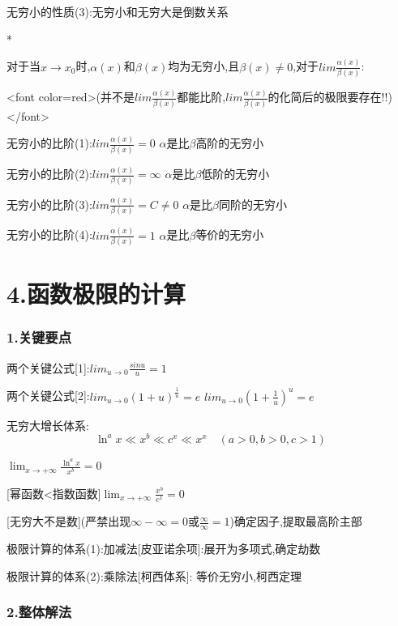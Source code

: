 \documentclass[11pt,a4paper,UTF8]{ctexart}
\begin{document}
无穷小的性质(3):无穷小和无穷大是倒数关系

\textit{}*

\textit{}对于当$x \to x_0$时,$\alpha(x)$和$\beta(x)$均为无穷小,且$\beta(x) \ne 0$,对于$lim\frac{\alpha(x)}{\beta(x)}$:\textit{}

\textit{}<font color=red>(并不是$lim\frac{\alpha(x)}{\beta(x)}$都能比阶,$lim\frac{\alpha(x)}{\beta(x)}$的化简后的极限要存在!!)</font>\textit{}

无穷小的比阶(1):$lim\frac{\alpha(x)}{\beta(x)}=0$	$\alpha$是比$\beta$高阶的无穷小

无穷小的比阶(2):$lim\frac{\alpha(x)}{\beta(x)}=\infty$	$\alpha$是比$\beta$低阶的无穷小

无穷小的比阶(3):$lim\frac{\alpha(x)}{\beta(x)}=C\not=0$ $\alpha$是比$\beta$同阶的无穷小

无穷小的比阶(4):$lim\frac{\alpha(x)}{\beta(x)}=1$ $\alpha$是比$\beta$等价的无穷小


\section{4.函数极限的计算}


\subsubsection{1.关键要点}

两个关键公式[1]:$lim_{u\rightarrow 0}\frac{sinu}{u}=1$

两个关键公式[2]:$lim_{u\rightarrow 0}(1+u)^{\frac{1}{u}}=e$	$lim_{u\rightarrow 0}(1+\frac{1}{u})^u=e$

无穷大增长体系:
\begin{equation*}
\ln^a x \ll x^b \ll c^x \ll x^x \quad (a > 0, b > 0, c > 1)
\end{equation*}


\begin{solbox}$\lim_{x \to +\infty} \frac{\ln^a x}{x^b} = 0$

[幂函数<指数函数]$\lim_{x \to +\infty} \frac{x^b}{c^x} = 0$

[无穷大不是数](严禁出现$\infty - \infty = 0$或$\frac{\infty}{\infty} = 1$)确定因子,提取最高阶主部
\end{solbox}

极限计算的体系(1):加减法[皮亚诺余项]:展开为多项式,确定劫数

极限计算的体系(2):乘除法[柯西体系]:  等价无穷小,柯西定理


\subsubsection{2.整体解法}
\end{document}
